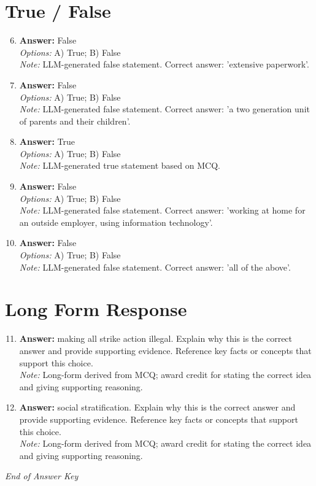 \documentclass[12pt]{article}
\begin{document}
\section*{True / False}
\begin{enumerate}[label=\arabic*.]
\setcounter{enumi}{5}
\item \textbf{Answer:} False
\\ \textit{Options:} A) True; B) False
\\ \textit{Note:} LLM-generated false statement. Correct answer: 'extensive paperwork'.
\item \textbf{Answer:} False
\\ \textit{Options:} A) True; B) False
\\ \textit{Note:} LLM-generated false statement. Correct answer: 'a two generation unit of parents and their children'.
\item \textbf{Answer:} True
\\ \textit{Options:} A) True; B) False
\\ \textit{Note:} LLM-generated true statement based on MCQ.
\item \textbf{Answer:} False
\\ \textit{Options:} A) True; B) False
\\ \textit{Note:} LLM-generated false statement. Correct answer: 'working at home for an outside employer, using information technology'.
\item \textbf{Answer:} False
\\ \textit{Options:} A) True; B) False
\\ \textit{Note:} LLM-generated false statement. Correct answer: 'all of the above'.
\end{enumerate}

\section*{Long Form Response}
\begin{enumerate}[label=\arabic*.]
\setcounter{enumi}{10}
\item \textbf{Answer:} making all strike action illegal. Explain why this is the correct answer and provide supporting evidence. Reference key facts or concepts that support this choice.
\\ \textit{Note:} Long-form derived from MCQ; award credit for stating the correct idea and giving supporting reasoning.
\item \textbf{Answer:} social stratification. Explain why this is the correct answer and provide supporting evidence. Reference key facts or concepts that support this choice.
\\ \textit{Note:} Long-form derived from MCQ; award credit for stating the correct idea and giving supporting reasoning.
\end{enumerate}

\vfill
\noindent\textit{End of Answer Key}
\end{document}
